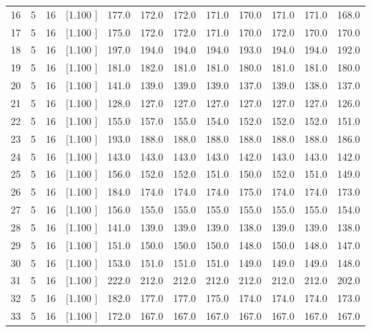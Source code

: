 \documentclass[12pt,a4paper]{article}
\begin{document}
\begin{center}
{\begin{tabular}{r r r r r r r r r r r r}
  16&  5& 16&[1.100     ]&   177.0&   172.0&   172.0&   171.0&   170.0&   171.0&   171.0&   168.0\\[-0.02in]
  17&  5& 16&[1.100     ]&   175.0&   172.0&   172.0&   171.0&   170.0&   172.0&   170.0&   170.0\\[-0.02in]
  18&  5& 16&[1.100     ]&   197.0&   194.0&   194.0&   194.0&   193.0&   194.0&   194.0&   192.0\\[-0.02in]
  19&  5& 16&[1.100     ]&   181.0&   182.0&   181.0&   181.0&   180.0&   181.0&   181.0&   180.0\\[-0.02in]
  20&  5& 16&[1.100     ]&   141.0&   139.0&   139.0&   139.0&   137.0&   139.0&   138.0&   137.0\\[-0.02in]
  21&  5& 16&[1.100     ]&   128.0&   127.0&   127.0&   127.0&   127.0&   127.0&   127.0&   126.0\\[-0.02in]
  22&  5& 16&[1.100     ]&   155.0&   157.0&   155.0&   154.0&   152.0&   152.0&   152.0&   151.0\\[-0.02in]
  23&  5& 16&[1.100     ]&   193.0&   188.0&   188.0&   188.0&   188.0&   188.0&   188.0&   186.0\\[-0.02in]
  24&  5& 16&[1.100     ]&   143.0&   143.0&   143.0&   143.0&   142.0&   143.0&   143.0&   142.0\\[-0.02in]
  25&  5& 16&[1.100     ]&   156.0&   152.0&   152.0&   151.0&   150.0&   152.0&   151.0&   149.0\\[-0.02in]
  26&  5& 16&[1.100     ]&   184.0&   174.0&   174.0&   174.0&   175.0&   174.0&   174.0&   173.0\\[-0.02in]
  27&  5& 16&[1.100     ]&   156.0&   155.0&   155.0&   155.0&   155.0&   155.0&   155.0&   154.0\\[-0.02in]
  28&  5& 16&[1.100     ]&   141.0&   139.0&   139.0&   139.0&   138.0&   139.0&   139.0&   138.0\\[-0.02in]
  29&  5& 16&[1.100     ]&   151.0&   150.0&   150.0&   150.0&   148.0&   150.0&   148.0&   147.0\\[-0.02in]
  30&  5& 16&[1.100     ]&   153.0&   151.0&   151.0&   151.0&   149.0&   149.0&   149.0&   148.0\\[-0.02in]
  31&  5& 16&[1.100     ]&   222.0&   212.0&   212.0&   212.0&   212.0&   212.0&   212.0&   202.0\\[-0.02in]
  32&  5& 16&[1.100     ]&   182.0&   177.0&   177.0&   175.0&   174.0&   174.0&   174.0&   173.0\\[-0.02in]
  33&  5& 16&[1.100     ]&   172.0&   167.0&   167.0&   167.0&   167.0&   167.0&   167.0&   167.0\\[-0.02in]

\end{tabular}}
\end{center}
\end{document}
